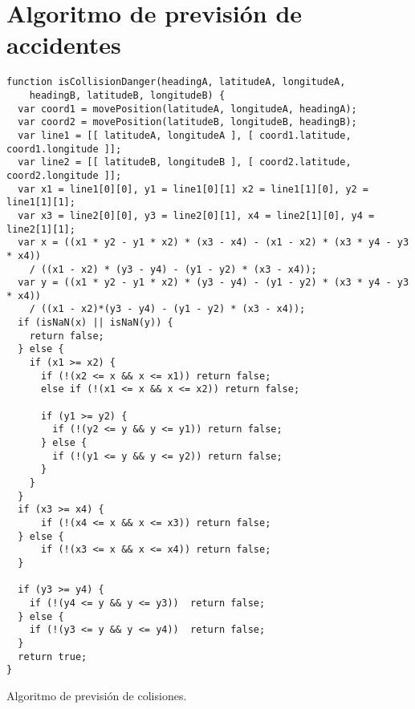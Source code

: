 \section{Algoritmo de previsión de accidentes}\label{apendice:posicion_relative}
\begin{listing}
\begin{minipage}{.4\textwidth}
\begin{verbatim}
function isCollisionDanger(headingA, latitudeA, longitudeA,
    headingB, latitudeB, longitudeB) {
  var coord1 = movePosition(latitudeA, longitudeA, headingA);
  var coord2 = movePosition(latitudeB, longitudeB, headingB);
  var line1 = [[ latitudeA, longitudeA ], [ coord1.latitude, coord1.longitude ]];
  var line2 = [[ latitudeB, longitudeB ], [ coord2.latitude, coord2.longitude ]];
  var x1 = line1[0][0], y1 = line1[0][1] x2 = line1[1][0], y2 = line1[1][1];
  var x3 = line2[0][0], y3 = line2[0][1], x4 = line2[1][0], y4 = line2[1][1];
  var x = ((x1 * y2 - y1 * x2) * (x3 - x4) - (x1 - x2) * (x3 * y4 - y3 * x4))
    / ((x1 - x2) * (y3 - y4) - (y1 - y2) * (x3 - x4));
  var y = ((x1 * y2 - y1 * x2) * (y3 - y4) - (y1 - y2) * (x3 * y4 - y3 * x4))
    / ((x1 - x2)*(y3 - y4) - (y1 - y2) * (x3 - x4));
  if (isNaN(x) || isNaN(y)) {
    return false;
  } else {
    if (x1 >= x2) {
      if (!(x2 <= x && x <= x1)) return false;
      else if (!(x1 <= x && x <= x2)) return false;

      if (y1 >= y2) {
        if (!(y2 <= y && y <= y1)) return false;
      } else {
        if (!(y1 <= y && y <= y2)) return false;
      }
    }
  }
  if (x3 >= x4) {
      if (!(x4 <= x && x <= x3)) return false;
  } else {
      if (!(x3 <= x && x <= x4)) return false;
  }

  if (y3 >= y4) {
    if (!(y4 <= y && y <= y3))  return false;
  } else {
    if (!(y3 <= y && y <= y4))  return false;
  }
  return true;
}
\end{verbatim}
\end{minipage}
\caption{Algoritmo de previsión de colisiones.}
\label{alg:deteccion_colisiones}
\end{listing}

